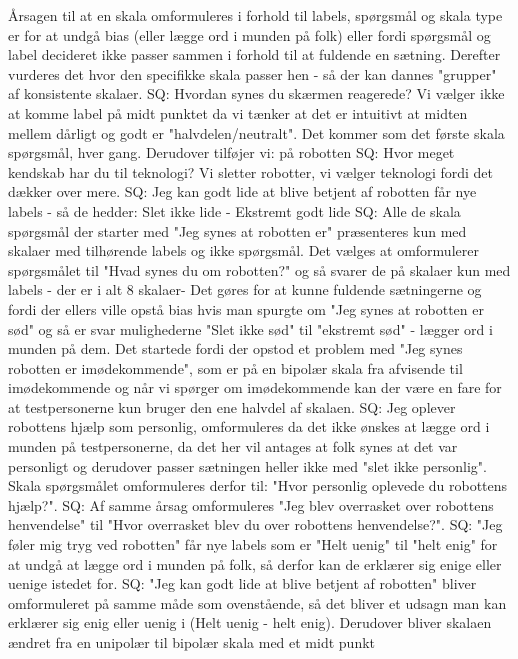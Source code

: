 Årsagen til at en skala omformuleres i forhold til labels, spørgsmål og skala type er for at undgå bias (eller lægge ord i munden på folk) eller fordi spørgsmål og label decideret ikke passer sammen i forhold til at fuldende en sætning. Derefter vurderes det hvor den specifikke skala passer hen - så der kan dannes "grupper" af konsistente skalaer.\blankline 
%
SQ: Hvordan synes du skærmen reagerede? Vi vælger ikke at komme label på midt punktet da vi tænker at det er intuitivt at midten mellem dårligt og godt er "halvdelen/neutralt". Det kommer som det første skala spørgsmål, hver gang. Derudover tilføjer vi: på robotten\blankline
%
SQ: Hvor meget kendskab har du til teknologi? Vi sletter robotter, vi vælger teknologi fordi det dækker over mere. \blankline
%
SQ: Jeg kan godt lide at blive betjent af robotten får nye labels - så de hedder: Slet ikke lide - Ekstremt godt lide\blankline
%
SQ: Alle de skala spørgsmål der starter med "Jeg synes at robotten er" præsenteres kun med skalaer med tilhørende labels og ikke spørgsmål. Det vælges at omformulerer spørgsmålet til "Hvad synes du om robotten?" og så svarer de på skalaer kun med labels - der er i alt 8 skalaer- Det gøres for at kunne fuldende sætningerne og fordi der ellers ville opstå bias hvis man spurgte om "Jeg synes at robotten er sød" og så er svar mulighederne "Slet ikke sød" til "ekstremt sød" - lægger ord i munden på dem. Det startede fordi der opstod et problem med "Jeg synes robotten er imødekommende", som er på en bipolær skala fra afvisende til imødekommende og når vi spørger om imødekommende kan der være en fare for at testpersonerne kun bruger den ene halvdel af skalaen. \blankline
%
SQ: Jeg oplever robottens hjælp som personlig, omformuleres da det ikke ønskes at lægge ord i munden på testpersonerne, da det her vil antages at folk synes at det var personligt og derudover passer sætningen heller ikke med "slet ikke personlig". Skala spørgsmålet omformuleres derfor til: "Hvor personlig oplevede du robottens hjælp?". \blankline
%
SQ: Af samme årsag omformuleres "Jeg blev overrasket over robottens henvendelse" til "Hvor overrasket blev du over robottens henvendelse?".\blankline
%
SQ: "Jeg føler mig tryg ved robotten" får nye labels som er "Helt uenig" til "helt enig" for at undgå at lægge ord i munden på folk, så derfor kan de erklærer sig enige eller uenige istedet for.\blankline 
%
SQ: "Jeg kan godt lide at blive betjent af robotten" bliver omformuleret på samme måde som ovenstående, så det bliver et udsagn man kan erklærer sig enig eller uenig i (Helt uenig - helt enig). Derudover bliver skalaen ændret fra en unipolær til bipolær skala med et midt punkt\blankline
